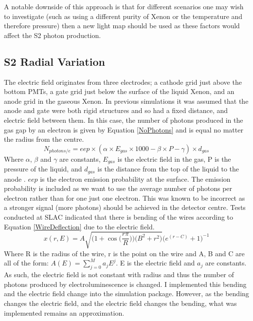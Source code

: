 \par
A notable downside of this approach is that for different scenarios one may wish to investigate (such as using a different purity of Xenon or the temperature and therefore pressure) then a new light map should be used as these factors would affect the S2 photon production.



\subsection{S2 Radial Variation} \label{S2RadialVariation}
\par
The electric field originates from three electrodes; a cathode grid just above the bottom PMTs, a gate grid just below the surface of the liquid Xenon, and an anode grid in the gaseous Xenon.
In previous simulations it was assumed that the anode and gate were both rigid structures and so had a fixed distance, and electric field between them.
In this case, the number of photons produced in the gas gap by an electron is given by Equation \ref{NoPhotons} and is equal no matter the radius from the centre. 
\begin{equation}
    N_{photons/e} = eep \times (\alpha \times E_{gas} \times 1000 - \beta \times P - \gamma) \times d_{gas}
    \label{NoPhotons}
\end{equation}
Where $\alpha$, $\beta$ and $\gamma$ are constants, $E_{gas}$ is the electric field in the gas, P is the pressure of the liquid, and $d_{gas}$ is the distance from the top of the liquid to the anode \cite{NoPhotonsPerElectron}.
$eep$ is the electron emission probability at the surface.
The emission probability is included as we want to use the average number of photons per electron rather than for one just one electron.
This was known to be incorrect as a stronger signal (more photons) should be achieved in the detector centre.
Tests conducted at SLAC indicated that there is bending of the wires according to Equation \ref{WireDeflection} due to the electric field.
\begin{equation}
    x(r,E) = A \sqrt{ \bigg( 1 + \cos{ \Big( \frac{r \pi}{R} } \Big) \bigg) \bigg( B^2 + r^2 \bigg) } \bigg( e^{(r-C)} + 1 \bigg)^{-1} 
    \label{WireDeflection}
\end{equation}
Where R is the radius of the wire, r is the point on the wire and A, B and C are all of the form: $A(E) = \sum_{j=0}^{M} a_{j} E^{j}$. E is the electric field and $a_{j}$ are constants.
As such, the electric field is not constant with radius and thus the number of photons produced by electroluminescence is changed.
I implemented this bending and the electric field change into the simulation package.
However, as the bending changes the electric field, and the electric field changes the bending, what was implemented remains an approximation.
